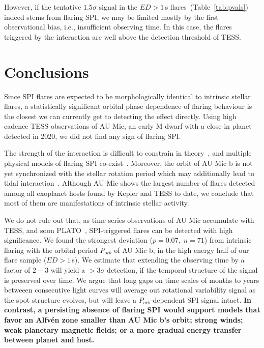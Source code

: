 \documentclass[fleqn,usenatbib]{mnras}%
\begin{document}
However, if the tentative $1.5\sigma$ signal in the $ED>1$\,s flares~(Table~\ref{tab:pvals}) indeed stems from flaring SPI, we may be limited mostly by the first observational bias, i.e., insufficient observing time. In this case, the flares triggered by the interaction are well above the detection threshold of TESS.

\section{Conclusions}
\label{sec:conclusions}
Since SPI flares are expected to be morphologically identical to intrinsic stellar flares, a statistically significant orbital phase dependence of flaring behaviour is the closest we can currently get to detecting the effect directly. Using high cadence TESS observations of AU Mic, an early M dwarf with a close-in planet detected in 2020, we did not find any sign of flaring SPI.

The strength of the interaction is difficult to constrain in theory~\citep{strugarek2019}, and multiple physical models of flaring SPI co-exist~\citep{lanza2018close-by, saur2013magnetic}. Moreover, the orbit of AU Mic b is not yet synchronized with the stellar rotation period which may additionally lead to tidal interaction~\citep{cuntz2000stellar}. Although AU Mic shows the largest number of flares detected among all exoplanet hosts found by Kepler and TESS to date, we conclude that most of them are manifestations of intrinsic stellar activity. 

We do not rule out that, as time series observations of AU Mic accumulate with TESS, and soon PLATO~\citep{rauer2014plato}, SPI-triggered flares can be detected with high significance. We found the strongest deviation \mbox{($p=0.07,\;n=71$)} from intrinsic flaring with the orbital period $P_{orb}$ of AU Mic b, in the high energy half of our flare sample ($ED>1$\,s). We estimate that extending the observing time by a factor of $2-3$ will yield a $>3\sigma$ detection, if the temporal structure of the signal is preserved over time. We argue that long gaps on time scales of months to years betweeen consecutive light curves will average out rotational variability signal as the spot structure evolves, but will leave a $P_{orb}$-dependent SPI signal intact. \textbf{In contrast, a persisting absence of flaring SPI would support models that favor an Alfv\'en zone smaller than AU Mic b's orbit; strong winds; weak planetary magnetic fields; or a more gradual energy transfer between planet and host.} 
\end{document}
